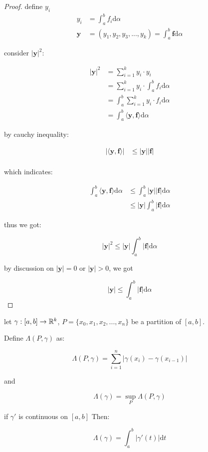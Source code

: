 \begin{proof}
    define $y_i$
    \begin{align*}
        y_i &= \int_a^b f_i \mathrm{d} \alpha \\
        \mathbf{y} &= \left(y_1,y_2,y_3,...,y_k \right) = \int_a^b \mathbf{f} \mathrm{d} \alpha
    \end{align*}

    consider $\left| \mathbf{y}\right|^2$:

    \begin{align*}
\left| \mathbf{y}\right|^2 &= \sum_{i=1}^{k} y_i \cdot y_i \\
&= \sum_{i=1}^{k} y_i \cdot \int_a^b f_i \mathrm{d} \alpha \\
&=  \int_a^b\sum_{i=1}^{k} y_i \cdot  f_i \mathrm{d} \alpha \\
&= \int_a^b \langle \mathbf{y}, \mathbf{f} \rangle \mathrm{d} \alpha
    \end{align*}

    by cauchy inequality:

    \begin{align*}
\left| \langle \mathbf{y}, \mathbf{f} \rangle \right|  &\le |\mathbf{y}| |\mathbf{f}| \\
    \end{align*}

    which indicates:

    \begin{align*}
    \int_a^b\langle \mathbf{y}, \mathbf{f} \rangle \mathrm{d} \alpha & \le     \int_a^b \left|\mathbf{y} \right| \left|\mathbf{f} \right|  \mathrm{d} \alpha \\
    & \le  \left|\mathbf{y} \right| \int_a^b \left|\mathbf{f} \right|  \mathrm{d} \alpha
    \end{align*}

    thus we got:

    \[
\left| \mathbf{y}\right|^2 \le \left|\mathbf{y} \right| \int_a^b \left|\mathbf{f} \right|  \mathrm{d} \alpha
    \]

    by discussion on $\left| \mathbf{y} \right| = 0$ or $\left| \mathbf{y} \right| > 0$, we got

    \[
\left| \mathbf{y}\right| \le \int_a^b \left|\mathbf{f} \right|  \mathrm{d} \alpha
    \]
\end{proof}

\begin{thm}
    let $\gamma: [a,b] \to \mathbb{R}^k$, $P = \{ x_0, x_1,x_2,...,x_n \} $ be a partition of $[a,b]$. 
    
    Define $\Lambda (P, \gamma)$  as:

    \[
        \Lambda(P, \gamma) = \sum_{i=1}^{n} \left| \gamma(x_i) - \gamma(x_{i-1})\right|
    \]

    and

    \[
        \Lambda(\gamma) = \sup_{P} \Lambda(P, \gamma)
    \]

    if $\gamma'$ is continuous on $[a,b]$ Then:

    \[
        \Lambda(\gamma) = \int_a^b \left| \gamma'(t) \right| \mathrm{d} t
    \]
\end{thm}

